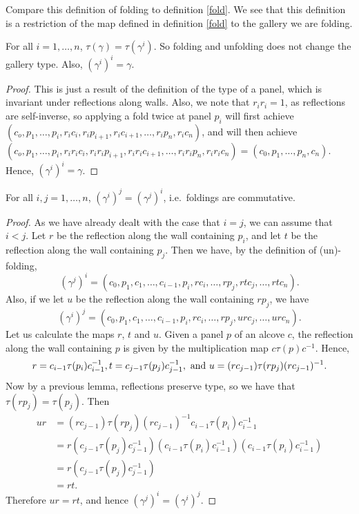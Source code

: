 \documentclass[11pt]{article}
\begin{document}
Compare this definition of folding to definition \ref{fold}. We see that this definition is a restriction of the map defined in definition \ref{fold} to the gallery we are folding. 
\begin{lemma}
    For all $i=1,\hdots ,n$, $\tau(\gamma)=\tau(\gamma^i)$. So folding and unfolding does not change the gallery type. Also, $(\gamma^i)^i=\gamma$.
\end{lemma}

\begin{proof}
    This is just a result of the definition of the type of a panel, which is invariant under reflections along walls. Also, we note that $r_ir_i=1$, as reflections are self-inverse, so applying a fold twice at panel $p_i$ will first achieve $(c_o,p_1,\hdots,p_i,r_ic_i,r_ip_{i+1},r_ic_{i+1},\hdots ,r_ip_n,r_ic_n)$, and will then achieve $(c_o,p_1,\hdots ,p_i,r_ir_ic_i,r_ir_ip_{i+1},r_ir_ic_{i+1},\hdots ,r_ir_ip_n,r_ir_ic_n)=(c_0,p_1,\hdots ,p_n,c_n)$. Hence, $(\gamma^i)^i=\gamma$.
\end{proof}

\begin{lemma}
    For all $i,j=1,\hdots,n$, $(\gamma^i)^j=(\gamma^j)^i$, i.e.\ foldings are commutative.
\end{lemma}

\begin{proof}
    As we have already dealt with the case that $i=j$, we can assume that $i<j$. Let $r$ be the reflection along the wall containing $p_i$, and let $t$ be the reflection along the wall containing $p_j$. Then we have, by the definition of (un)-folding,
    \[(\gamma^j)^i=(c_0,p_1,c_1,\hdots,c_{i-1},p_i,rc_i,\hdots ,rp_j,rtc_j,\hdots ,rtc_n).\]
    Also, if we let $u$ be the reflection along the wall containing $rp_j$, we have
    \[(\gamma^i)^j=(c_0,p_1,c_1,\hdots ,c_{i-1},p_i,rc_i,\hdots ,rp_j,urc_j,\hdots ,urc_n).\]
    Let us calculate the maps $r$, $t$ and $u$. Given a panel $p$ of an alcove $c$, the reflection along the wall containing $p$ is given by the multiplication map $c\tau(p)c^{-1}$. Hence,
    \[r=c_{i-1}\tau(p_i)c_{i-1}^{-1}, t=c_{j-1}\tau(p_j)c_{j-1}^{-1}, \textnormal{ and } u=(rc_{j-1})\tau(rp_j)(rc_{j-1})^{-1}.\]
    Now by a previous lemma, reflections preserve type, so we have that $\tau(rp_j)=\tau(p_j)$. Then
    \[\begin{aligned}
        ur & =(rc_{j-1})\tau(rp_j)(rc_{j-1})^{-1}c_{i-1}\tau(p_i)c_{i-1}^{-1}\\
           & =r(c_{j-1}\tau(p_j)c_{j-1}^{-1})(c_{i-1}\tau(p_i)c_{i-1}^{-1})(c_{i-1}\tau(p_i)c_{i-1}^{-1})\\
           & = r(c_{j-1}\tau(p_j)c_{j-1}^{-1})\\
           & =rt.
    \end{aligned}\]
    Therefore $ur=rt$, and hence $(\gamma^j)^i=(\gamma^i)^j$.
\end{proof}
\end{document}

